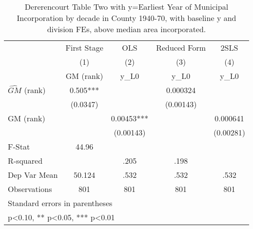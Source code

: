 \begin{table}[htbp]\centering
\def\sym#1{\ifmmode^{#1}\else\(^{#1}\)\fi}
\caption{Dererencourt Table Two with y=Earliest Year of Municipal Incorporation by decade in County 1940-70, with baseline y and division FEs, above median area incorporated.}
\begin{tabular}{l*{4}{c}}
\toprule
                    & First Stage   &         OLS   &Reduced Form   &        2SLS   \\
                    &\multicolumn{1}{c}{(1)}&\multicolumn{1}{c}{(2)}&\multicolumn{1}{c}{(3)}&\multicolumn{1}{c}{(4)}\\
                    &\multicolumn{1}{c}{GM  (rank)}&\multicolumn{1}{c}{y\_L0}&\multicolumn{1}{c}{y\_L0}&\multicolumn{1}{c}{y\_L0}\\
\midrule
$\hat{GM}$ (rank)   &       0.505***&               &    0.000324   &               \\
                    &    (0.0347)   &               &   (0.00143)   &               \\
\addlinespace
GM  (rank)          &               &     0.00453***&               &    0.000641   \\
                    &               &   (0.00143)   &               &   (0.00281)   \\
\midrule
F-Stat              &       44.96   &               &               &               \\
R-squared           &               &        .205   &        .198   &               \\
Dep Var Mean        &      50.124   &        .532   &        .532   &        .532   \\
Observations        &         801   &         801   &         801   &         801   \\
\bottomrule
\multicolumn{5}{l}{\footnotesize Standard errors in parentheses}\\
\multicolumn{5}{l}{\footnotesize * p<0.10, ** p<0.05, *** p<0.01}\\
\end{tabular}
\end{table}

